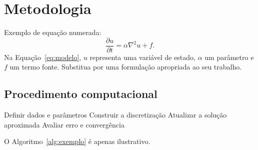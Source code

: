 \chapter{Metodologia}
Exemplo de equação numerada:
\begin{equation}\label{eq:modelo}\frac{\partial u}{\partial t}=\alpha\nabla^2 u+f.\end{equation}
Na Equação~\eqref{eq:modelo}, $u$ representa uma variável de estado, $\alpha$ um parâmetro e $f$ um termo fonte. Substitua por uma formulação apropriada ao seu trabalho.
\section{Procedimento computacional}
\begin{algorithm}[htbp]\caption{Exemplo de procedimento numérico}\label{alg:exemplo}\begin{algorithmic}[1]
\State Definir dados e parâmetros
\State Construir a discretização
\State Atualizar a solução aproximada\EndFor
\State Avaliar erro e convergência
\end{algorithmic}\end{algorithm}
O Algoritmo~\ref{alg:exemplo} é apenas ilustrativo.
